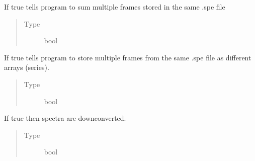 \documentclass[a4paper,10pt,english]{sphinxmanual}
\begin{document}
\begin{fulllineitems}
\begin{fulllineitems}
\label{\detokenize{sfgtools:sfgtools.SFGProcessTools.sum_accumulations}}
\sphinxAtStartPar
If true tells program to sum multiple frames stored in the same .spe file
\begin{quote}\begin{description}
\item[{Type}] \leavevmode
\sphinxAtStartPar
bool

\end{description}\end{quote}

\end{fulllineitems}


\begin{fulllineitems}
\label{\detokenize{sfgtools:sfgtools.SFGProcessTools.series_accumulations}}
\sphinxAtStartPar
If true tells program to store multiple frames from the same .spe file as different arrays (series).
\begin{quote}\begin{description}
\item[{Type}] \leavevmode
\sphinxAtStartPar
bool

\end{description}\end{quote}

\end{fulllineitems}


\begin{fulllineitems}
\label{\detokenize{sfgtools:sfgtools.SFGProcessTools.downconvert_check}}
\sphinxAtStartPar
If true then spectra are downconverted.
\begin{quote}\begin{description}
\item[{Type}] \leavevmode
\sphinxAtStartPar
bool

\end{description}\end{quote}


\end{fulllineitems}
\end{fulllineitems}
\end{document}
